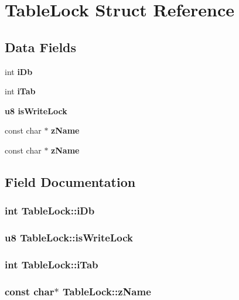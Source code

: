 \section{Table\-Lock Struct Reference}
\label{structTableLock}
\subsection*{Data Fields}
\begin{CompactItemize}
\item 
int \bf{i\-Db}
\item 
int \bf{i\-Tab}
\item 
\bf{u8} \bf{is\-Write\-Lock}
\item 
const char $\ast$ \bf{z\-Name}
\item 
const char $\ast$ \bf{z\-Name}
\end{CompactItemize}


\subsection{Field Documentation}
\subsubsection{\setlength{\rightskip}{0pt plus 5cm}int \bf{Table\-Lock::i\-Db}}\label{structTableLock_6c75fdf9b220caf89d9d2da53a84a7b2}


\subsubsection{\setlength{\rightskip}{0pt plus 5cm}\bf{u8} \bf{Table\-Lock::is\-Write\-Lock}}\label{structTableLock_c10bc4f1f69930bed0f71d69d1bb9862}


\subsubsection{\setlength{\rightskip}{0pt plus 5cm}int \bf{Table\-Lock::i\-Tab}}\label{structTableLock_f3a203a58fa7c248600fc81180926809}


\subsubsection{\setlength{\rightskip}{0pt plus 5cm}const char$\ast$ \bf{Table\-Lock::z\-Name}}\label{structTableLock_87e67bf1089520306a15985a72d34ff2}


